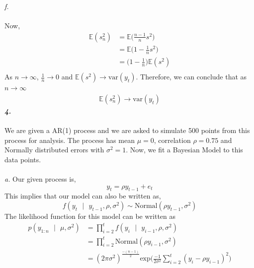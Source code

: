 \documentclass[11pt]{article}
\begin{document}
\emph{f.} \\ \\
Now,
\begin{equation}
  \nonumber
  \begin{aligned}
    \mathbb{E}(s_n^2) & = \mathbb{E}\bigg(\frac{n-1}{n}s^2\bigg) \\
    & =  \mathbb{E}\bigg(1-\frac{1}{n}s^2\bigg)\\
    & = \bigg(1-\frac{1}{n}\bigg)\mathbb{E}(s^2)\\
  \end{aligned}
\end{equation}
As $n \rightarrow \infty$, $\frac{1}{n} \rightarrow 0$ and $\mathbb{E}(s^2) \rightarrow \text{var}(y_{t})$. Therefore, we can conclude that as $n \rightarrow \infty$
\begin{equation}
  \nonumber
  \begin{aligned}
    \mathbb{E}(s_n^2) \rightarrow \text{var}(y_{t})
  \end{aligned}
\end{equation}
\textbf{\emph{4.}}\\ \\
We are given a AR(1) process and we are asked to simulate 500 points from this process for analysis. The process has mean $\mu = 0$, correlation $\rho = 0.75$ and Normally distributed errors with $\sigma^2 = 1$. Now, we fit a Bayesian Model to this data points.\\ \\
\emph{a.}
Our given process is,
\begin{equation}
  \nonumber
  y_{t} = \rho y_{t-1} + e_{t}
\end{equation}
This implies that our model can also be written as,
\begin{equation}
  \nonumber
  f(y_{t} \text{ }| \text{ } y_{t-1}, \rho, \sigma^2) \sim \text{Normal}(\rho y_{t-1}, \sigma^2)
\end{equation}
The likelihood function for this model can be written as
\begin{equation}
  \nonumber
  \begin{aligned}
    p(y_{1:n} \text{ } | \text{ } \mu, \sigma^2) &= \prod_{i = 2}^{t}f(y_{i} \text{ }| \text{ } y_{i-1}, \rho, \sigma^2)\\
    & = \prod_{i = 2}^{t}\text{Normal}(\rho y_{i-1}, \sigma^2)\\
    & = (2\pi\sigma^2)^{\frac{-(n-1)}{2}}\text{exp}\bigg(\frac{-1}{2\sigma^2}\sum_{i = 2}^{t}(y_{i} - \rho y_{i-1})^2\bigg)\\
  \end{aligned}
\end{equation}
\end{document}
